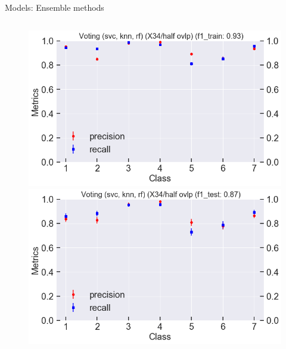 \documentclass{if-beamer}
\begin{document}
\begin{frame}{Models:  Ensemble methods}
\begin{columns}
\begin{column}{0.5\textwidth}
             \begin{figure}
            \includegraphics[scale=0.23]{./figs/voting_X34_train.png}
            \includegraphics[scale=0.23]{./figs/voting_X34_test.png}
            \end{figure}  
        
 \end{column}

 \end{columns}
  \end{frame}
\end{document}
